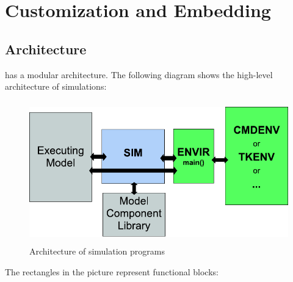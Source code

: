 \chapter{Customization and Embedding}
\label{cha:the-design-of-omnet}

\section{Architecture}

{\opp} has a modular architecture. The following diagram shows the
high-level architecture of {\opp} simulations:

\begin{figure}[htbp]
  \begin{center}
    \includegraphics[width=4.757in, height=2.412in]{figures/usmanFig18}
    \caption{Architecture of {\opp} simulation programs}
  \end{center}
\end{figure}

The rectangles in the picture represent functional blocks:

